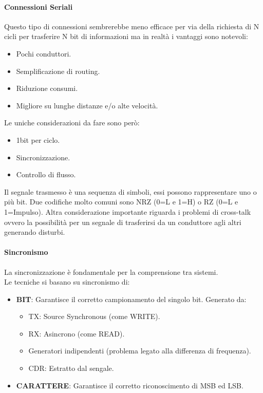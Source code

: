 \documentclass[12pt]{article}
\begin{document}
\paragraph{Connessioni Seriali} Questo tipo di connessioni sembrerebbe meno efficace per via della richiesta di N cicli per trasferire N bit di informazioni ma in realtà i vantaggi sono notevoli:
\begin{itemize}
  \item Pochi conduttori.
  \item Semplificazione di routing.
  \item Riduzione consumi.
  \item Migliore su lunghe distanze e/o alte velocità.
\end{itemize}
Le uniche considerazioni da fare sono però:
\begin{itemize}
  \item 1bit per ciclo.
  \item Sincronizzazione.
  \item Controllo di flusso.
\end{itemize}
Il segnale trasmesso è una sequenza di simboli, essi possono rappresentare uno o più bit. Due codifiche molto comuni sono NRZ (0=L e 1=H) o RZ (0=L e 1=Impulso). Altra considerazione importante riguarda i problemi di cross-talk ovvero la possibilità per un segnale di trasferirsi da un conduttore agli altri generando disturbi.
\paragraph{Sincronismo} La sincronizzazione è fondamentale per la comprensione tra sistemi.\\
Le tecniche si basano su sincronismo di:
\begin{itemize}
  \item \textbf{BIT}: Garantisce il corretto campionamento del singolo bit. Generato da:
  \begin{itemize}
    \item TX: Source Synchronous (come WRITE).
    \item RX: Asincrono (come READ).
    \item Generatori indipendenti (problema legato alla differenza di frequenza).
    \item CDR: Estratto dal sengale.
  \end{itemize}
  \item \textbf{CARATTERE}: Garantisce il corretto riconoscimento di MSB ed LSB.
\end{itemize} %
\end{document}
